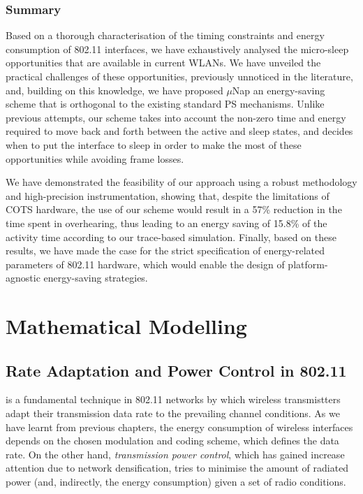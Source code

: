 \documentclass[twoside,nohyper]{tufte-book}
\newcommand{\partseparator}{
  \noindent\leavevmode\leaders\hrule height 0.8ex depth \dimexpr0.4pt-0.8ex\hfill\kern0pt
  \newline~\vspace{-0.5\baselineskip}\newline}
\theoremstyle{definition}
\theoremstyle{definition}
\theoremstyle{definition}
\theoremstyle{remark}
\begin{document}
\section{Summary}\label{summary-2}

Based on a thorough characterisation of the timing constraints and
energy consumption of 802.11 interfaces, we have exhaustively analysed
the micro-sleep opportunities that are available in current WLANs. We
have unveiled the practical challenges of these opportunities,
previously unnoticed in the literature, and, building on this knowledge,
we have proposed
\(\mu\)Nap\cite[0pt]{contrib-05a,contrib-05b}
an energy-saving scheme that is orthogonal to the existing standard PS
mechanisms. Unlike previous attempts, our scheme takes into account the
non-zero time and energy required to move back and forth between the
active and sleep states, and decides when to put the interface to sleep
in order to make the most of these opportunities while avoiding frame
losses.

We have demonstrated the feasibility of our approach using a robust
methodology and high-precision instrumentation, showing that, despite
the limitations of COTS hardware, the use of our scheme would result in
a 57\% reduction in the time spent in overhearing, thus leading to an
energy saving of 15.8\% of the activity time according to our
trace-based simulation. Finally, based on these results, we have made
the case for the strict specification of energy-related parameters of
802.11 hardware, which would enable the design of platform-agnostic
energy-saving strategies.

\addtocontents{toc}{\partseparator}

\part{Mathematical
Modelling}\label{part-mathematical-modelling}

\chapter{Rate Adaptation and Power Control in 802.11}\label{ch:06}

 is a fundamental technique in 802.11
networks by which wireless transmistters adapt their transmission data
rate to the prevailing channel conditions. As we have learnt from
previous chapters, the energy consumption of wireless interfaces depends
on the chosen modulation and coding scheme, which defines the data rate.
On the other hand, \emph{transmission power control}, which has gained
increase attention due to network densification, tries to minimise the
amount of radiated power (and, indirectly, the energy consumption) given
a set of radio conditions.
\end{document}
